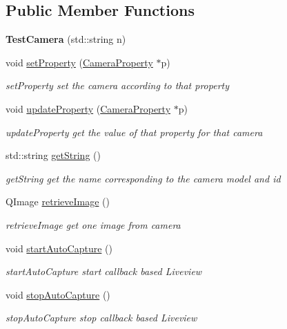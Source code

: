 \subsection*{Public Member Functions}
\begin{DoxyCompactItemize}
\item 
\hypertarget{class_test_camera_a46fb8a67d24675886760e6fc0058edb3}{{\bfseries Test\-Camera} (std\-::string n)}\label{class_test_camera_a46fb8a67d24675886760e6fc0058edb3}

\item 
void \hyperlink{class_test_camera_a92507f0e4601f93912b06297e4b59d99}{set\-Property} (\hyperlink{class_camera_manager_1_1_camera_property}{Camera\-Property} $\ast$p)
\begin{DoxyCompactList}\small\item\em set\-Property set the camera according to that property \end{DoxyCompactList}\item 
void \hyperlink{class_test_camera_a6b0c9e25baafe0a8d211b32851cb67b3}{update\-Property} (\hyperlink{class_camera_manager_1_1_camera_property}{Camera\-Property} $\ast$p)
\begin{DoxyCompactList}\small\item\em update\-Property get the value of that property for that camera \end{DoxyCompactList}\item 
std\-::string \hyperlink{class_test_camera_a5ddb007a4c0c44e06b24787298f1c97c}{get\-String} ()
\begin{DoxyCompactList}\small\item\em get\-String get the name corresponding to the camera model and id \end{DoxyCompactList}\item 
Q\-Image \hyperlink{class_test_camera_a283bd75f1b9500e35ba7aa252c2df14e}{retrieve\-Image} ()
\begin{DoxyCompactList}\small\item\em retrieve\-Image get one image from camera \end{DoxyCompactList}\item 
\hypertarget{class_test_camera_a095498b65800c150009292e73f765621}{void \hyperlink{class_test_camera_a095498b65800c150009292e73f765621}{start\-Auto\-Capture} ()}\label{class_test_camera_a095498b65800c150009292e73f765621}

\begin{DoxyCompactList}\small\item\em start\-Auto\-Capture start callback based Liveview \end{DoxyCompactList}\item 
\hypertarget{class_test_camera_a52f8f0ee49d83d927878cc2dd64a0af1}{void \hyperlink{class_test_camera_a52f8f0ee49d83d927878cc2dd64a0af1}{stop\-Auto\-Capture} ()}\label{class_test_camera_a52f8f0ee49d83d927878cc2dd64a0af1}

\begin{DoxyCompactList}\small\item\em stop\-Auto\-Capture stop callback based Liveview \end{DoxyCompactList}\end{DoxyCompactItemize}
